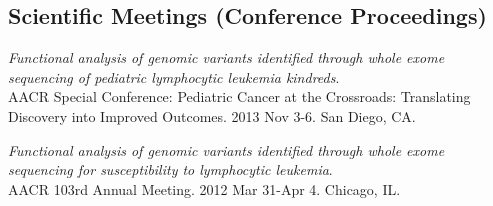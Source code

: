 \documentclass[10pt]{article}
\begin{document}
\subsection*{Scientific Meetings (Conference Proceedings)} 

\item
{\it Functional analysis of genomic variants identified through whole exome sequencing of pediatric lymphocytic leukemia kindreds}. \\
AACR Special Conference: Pediatric Cancer at the Crossroads: Translating Discovery into Improved Outcomes. 2013 Nov 3-6. San Diego, CA.
\item 
{\it Functional analysis of genomic variants identified through whole exome sequencing for susceptibility to lymphocytic leukemia}. \\
AACR 103rd Annual Meeting. 2012 Mar 31-Apr 4. Chicago, IL.
	
\end{document}

